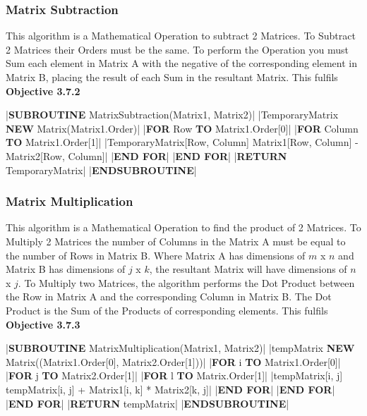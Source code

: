 \begin{flushleft}
                \vspace{0.5cm}
            \subsubsection{Matrix Subtraction}
                This algorithm is a Mathematical Operation to subtract 2 Matrices. To Subtract 2 Matrices their Orders
                must be the same. To perform the Operation you must Sum each element in Matrix A with the negative of the 
                corresponding element in Matrix B, placing the result of each Sum in the resultant Matrix. This fulfils \textbf{Objective 3.7.2}

                \vspace{0.2cm}
                \begin{pseudocode}
|\textbf{SUBROUTINE} MatrixSubtraction(Matrix1, Matrix2)|
    |TemporaryMatrix \leftarrow \textbf{NEW} Matrix(Matrix1.Order)|
    |\textbf{FOR} Row  \textbf{TO} Matrix1.Order[0]|
        |\textbf{FOR} Column  \textbf{TO} Matrix1.Order[1]|
            |TemporaryMatrix[Row, Column] \leftarrow Matrix1[Row, Column] - Matrix2[Row, Column]|
        |\textbf{END FOR}|
    |\textbf{END FOR}|
    |\textbf{RETURN} TemporaryMatrix|
|\textbf{ENDSUBROUTINE}|
                \end{pseudocode}

                \vspace{0.5cm}
            \subsubsection{Matrix Multiplication}
                This algorithm is a Mathematical Operation to find the product of 2 Matrices. To Multiply 2 Matrices
                the number of Columns in the Matrix A must be equal to the number of Rows in Matrix B. Where Matrix A has
                dimensions of $m$ x $n$ and Matrix B has dimensions of $j$ x $k$, the resultant Matrix will have dimensions of 
                $n$ x $j$. To Multiply two Matrices, the algorithm performs the Dot Product between the Row in Matrix A and the 
                corresponding Column in Matrix B. The Dot Product is the Sum of the Products of corresponding elements. This fulfils \textbf{Objective 3.7.3}

                \vspace{0.2cm}
                \begin{pseudocode}
|\textbf{SUBROUTINE} MatrixMultiplication(Matrix1, Matrix2)|
    |tempMatrix \leftarrow \textbf{NEW} Matrix((Matrix1.Order[0], Matrix2.Order[1]))|
    |\textbf{FOR} i  \textbf{TO} Matrix1.Order[0]|
        |\textbf{FOR} j  \textbf{TO} Matrix2.Order[1]|
            |\textbf{FOR} l  \textbf{TO} Matrix.Order[1]|
                |tempMatrix[i, j] \leftarrow tempMatrix[i, j] + Matrix1[i, k] * Matrix2[k, j]|
            |\textbf{END FOR}|
        |\textbf{END FOR}|
    |\textbf{END FOR}|
    |\textbf{RETURN} tempMatrix|
|\textbf{ENDSUBROUTINE}|
                \end{pseudocode}   


\end{flushleft}
